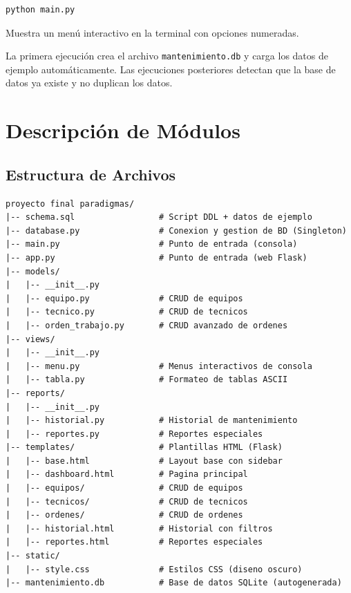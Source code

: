 \documentclass[12pt, a4paper]{article}
\begin{document}
\begin{lstlisting}[style=bash]
python main.py
\end{lstlisting}

Muestra un menú interactivo en la terminal con opciones numeradas.

\begin{warnbox}[Importante]
La primera ejecución crea el archivo \texttt{mantenimiento.db} y carga los datos de ejemplo automáticamente. Las ejecuciones posteriores detectan que la base de datos ya existe y no duplican los datos.
\end{warnbox}

\newpage
\section{Descripción de Módulos}

\subsection{Estructura de Archivos}

\begin{lstlisting}[language={}, basicstyle=\ttfamily\small, frame=none, numbers=none]
proyecto final paradigmas/
|-- schema.sql                 # Script DDL + datos de ejemplo
|-- database.py                # Conexion y gestion de BD (Singleton)
|-- main.py                    # Punto de entrada (consola)
|-- app.py                     # Punto de entrada (web Flask)
|-- models/
|   |-- __init__.py
|   |-- equipo.py              # CRUD de equipos
|   |-- tecnico.py             # CRUD de tecnicos
|   |-- orden_trabajo.py       # CRUD avanzado de ordenes
|-- views/
|   |-- __init__.py
|   |-- menu.py                # Menus interactivos de consola
|   |-- tabla.py               # Formateo de tablas ASCII
|-- reports/
|   |-- __init__.py
|   |-- historial.py           # Historial de mantenimiento
|   |-- reportes.py            # Reportes especiales
|-- templates/                 # Plantillas HTML (Flask)
|   |-- base.html              # Layout base con sidebar
|   |-- dashboard.html         # Pagina principal
|   |-- equipos/               # CRUD de equipos
|   |-- tecnicos/              # CRUD de tecnicos
|   |-- ordenes/               # CRUD de ordenes
|   |-- historial.html         # Historial con filtros
|   |-- reportes.html          # Reportes especiales
|-- static/
|   |-- style.css              # Estilos CSS (diseno oscuro)
|-- mantenimiento.db           # Base de datos SQLite (autogenerada)
\end{lstlisting}
\end{document}
